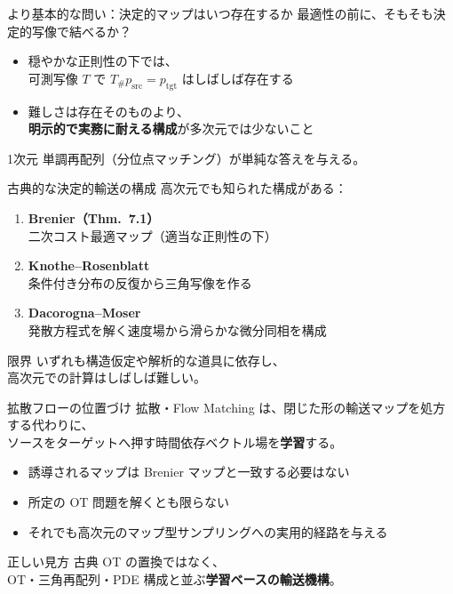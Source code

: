 \asmain
\begin{frame}{より基本的な問い：決定的マップはいつ存在するか}
    最適性の前に、そもそも決定的写像で結べるか？
    \begin{itemize}
        \item 穏やかな正則性の下では、\\
        可測写像 $T$ で $T_\# p_{\mathrm{src}}=p_{\mathrm{tgt}}$ はしばしば存在する
        \item 難しさは存在そのものより、\\
        \textbf{明示的で実務に耐える構成}が多次元では少ないこと
    \end{itemize}
    \begin{block}{1次元}
        単調再配列（分位点マッチング）が単純な答えを与える。
    \end{block}
\end{frame}
\asmain
\begin{frame}{古典的な決定的輸送の構成}
    高次元でも知られた構成がある：
    \begin{enumerate}
        \item \textbf{Brenier（Thm.\ 7.1）}\\
        二次コスト最適マップ（適当な正則性の下）
        \item \textbf{Knothe--Rosenblatt}\\
        条件付き分布の反復から三角写像を作る
        \item \textbf{Dacorogna--Moser}\\
        発散方程式を解く速度場から滑らかな微分同相を構成
    \end{enumerate}
    \begin{exampleblock}{限界}
        いずれも構造仮定や解析的な道具に依存し、\\
        高次元での計算はしばしば難しい。
    \end{exampleblock}
\end{frame}
\asmain
\begin{frame}{拡散フローの位置づけ}
    拡散・Flow Matching は、閉じた形の輸送マップを処方する代わりに、\\
    ソースをターゲットへ押す時間依存ベクトル場を\textbf{学習}する。
    \begin{itemize}
        \item 誘導されるマップは Brenier マップと一致する必要はない
        \item 所定の OT 問題を解くとも限らない
        \item それでも高次元のマップ型サンプリングへの実用的経路を与える
    \end{itemize}
    \begin{alertblock}{正しい見方}
        古典 OT の置換ではなく、\\
        OT・三角再配列・PDE 構成と並ぶ\textbf{学習ベースの輸送機構}。
    \end{alertblock}
\end{frame}

